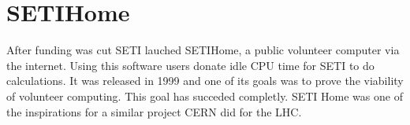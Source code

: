 \section{SETI\MVAt Home}

After funding was cut SETI lauched SETI\MVAt Home, a public volunteer computer 
via the internet. Using this software users donate idle CPU time for SETI to do 
calculations\cite{www-hid-sp18-601-sathome-about}. It was released in 1999 and 
one of its goals was to prove the 
viability of volunteer computing. This goal has succeded completly. SETI\MVAt 
Home was one of the inspirations for a similar project CERN did for the LHC.